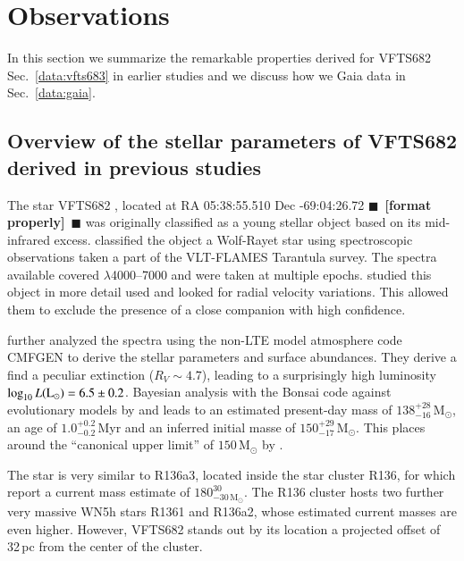 \documentclass[apjl,twocolumn]{emulateapj}
\newcommand{\todo}[1]{{\large $\blacksquare$~\textbf{\color{red}[#1]}}~$\blacksquare$}
\newcommand{\SdM}[1]{{{\color{Sepia}{#1}}}}
\renewcommand{\SdM}[1]{{{{#1}}}}
\newcommand{\Msun}{{\,\mathrm{M}_\odot}}
\DeclareRobustCommand{\Secref}[1]{Sec.~\ref{#1}}
\begin{document}
\section{Observations}
\label{sec:sample}
\SdM{
In this section we summarize the remarkable properties derived for VFTS682 \Secref{data:vfts683} in earlier studies and we discuss how we Gaia data in 
\Secref{data:gaia}.

\subsection{ Overview of the stellar parameters of VFTS682 derived in previous studies \label{data:vfts683}}

The star VFTS682  \citep{Evans+2011}, located at  RA 05:38:55.510  Dec -69:04:26.72 \todo{format properly}
was originally classified as a young stellar object \citep{Gruendl+2009} based on its mid-infrared excess.  \citet{Evans+2011} classified the object a Wolf-Rayet star using spectroscopic observations taken a part of the VLT-FLAMES Tarantula survey.  The spectra available covered $\lambda$4000--7000 and were taken at multiple epochs. \citep{Bestenlehner+2011} studied this object in more detail used and looked for radial velocity variations. This allowed them to exclude the presence of a close companion with high confidence.  

\citep{Bestenlehner+2011} further analyzed the spectra using the non-LTE model atmosphere code CMFGEN \citep{Hillier+1998} to derive the stellar parameters and surface abundances. They derive a find a peculiar extinction ($R_V \sim 4.7$), leading to a surprisingly high luminosity $\log_{10} L (\rm{L_\odot}) =  6.5\pm0.2$. Bayesian analysis with the Bonsai code \citep{Schneider+2017} against  evolutionary models by \citet{Brott+2011} and \citet{Kohler+2015} leads to an estimated present-day mass of  $138^{+28}_ {-16}\Msun$, an age of $1.0^{+0.2}_{-0.2}$\,Myr and an inferred initial masse of $150^{+29}_{-17}\Msun$.  This places around the ``canonical upper limit'' of $150\Msun$  by \citet{Figer2005}.

The star is very similar to R136a3, located inside the star cluster R136, \citep{Crowther+2010}  for which \citet{Crowther+2016} report a current mass estimate of $180^{30}_{-30\Msun}$. The R136 cluster hosts two further very massive WN5h stars R1361 and R136a2, whose estimated current masses are even higher.   However, VFTS682 stands out by its location a projected offset of 32\,pc from the center of the cluster.  

}
\end{document}
